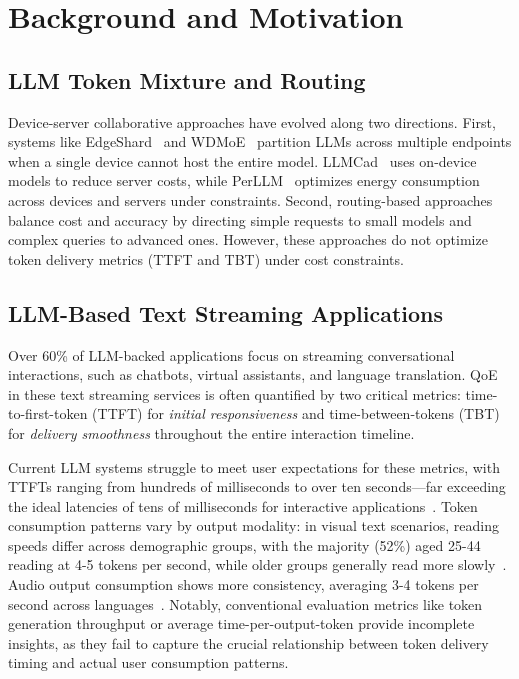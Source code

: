 \section{Background and Motivation}

\subsection{LLM Token Mixture and Routing}
\label{sec:llm_routing}
Device-server collaborative approaches have evolved along two directions. First, systems like EdgeShard~\cite{zhang2024edgeshard} and WDMoE~\citep{xue2024wdmoe} partition LLMs across multiple endpoints when a single device cannot host the entire model. LLMCad~\cite{xu2023llmcad} uses on-device models to reduce server costs, while PerLLM~\citep{yang2024perllm} optimizes energy consumption across devices and servers under constraints. Second, routing-based approaches~\citep{routellm,hybridllm} balance cost and accuracy by directing simple requests to small models and complex queries to advanced ones. However, these approaches do not optimize token delivery metrics (TTFT and TBT) under cost constraints.

\subsection{LLM-Based Text Streaming Applications}
\label{sec:llm_applications}
Over 60\% of LLM-backed applications focus on streaming conversational interactions, such as chatbots, virtual assistants, and language translation.
QoE in these text streaming services is often quantified by two critical metrics: time-to-first-token (TTFT) for \emph{initial responsiveness} and time-between-tokens (TBT) for \emph{delivery smoothness} throughout the entire interaction timeline.

Current LLM systems struggle to meet user expectations for these metrics, with TTFTs ranging from hundreds of milliseconds to over ten seconds—far exceeding the ideal latencies of tens of milliseconds for interactive applications~\cite{maki2004latency,latency_comp_surv}. Token consumption patterns vary by output modality: in visual text scenarios, reading speeds differ across demographic groups, with the majority (52\%) aged 25-44 reading at 4-5 tokens per second, while older groups generally read more slowly~\cite{andes,andes_read,word_to_token}. Audio output consumption shows more consistency, averaging 3-4 tokens per second across languages~\cite{andes,andes_speak,average-speaking-rate}. Notably, conventional evaluation metrics like token generation throughput or average time-per-output-token provide incomplete insights, as they fail to capture the crucial relationship between token delivery timing and actual user consumption patterns.


